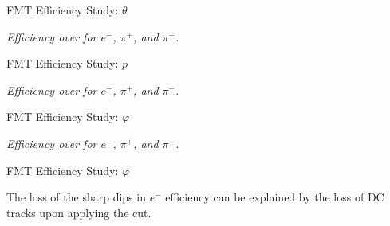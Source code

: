 \begin{frame}{FMT Efficiency Study: $\theta$}
    \begin{center}
        \vspace{-6pt}
        \begin{figure}[t]
        \end{figure}
        \scriptsize{\textit{Efficiency over \ef{$\theta$} for $e^-$, $\pi^+$, and $\pi^-$.}}
    \end{center}

\end{frame}

\begin{frame}{FMT Efficiency Study: $p$}
    \begin{center}
        \vspace{-6pt}
        \begin{figure}[t]
        \end{figure}
        \scriptsize{\textit{Efficiency over  for $e^-$, $\pi^+$, and $\pi^-$.}}
    \end{center}

\end{frame}

\begin{frame}{FMT Efficiency Study: $\varphi$}
    \begin{center}
        \vspace{-6pt}
        \begin{figure}[t]
        \end{figure}
        \scriptsize{\textit{Efficiency over \ef{$\varphi$} for $e^-$, $\pi^+$, and $\pi^-$.}}
    \end{center}

\end{frame}

\begin{frame}{FMT Efficiency Study: $\varphi$}
    \label{20.04::fmt_efficiency_study_end}

    The loss of the sharp dips in $e^-$ \ef{$\varphi$} efficiency can be explained by the loss of DC tracks upon applying the cut.

    \begin{center}
        \begin{figure}[t]
        \end{figure}
    \end{center}

\end{frame}
